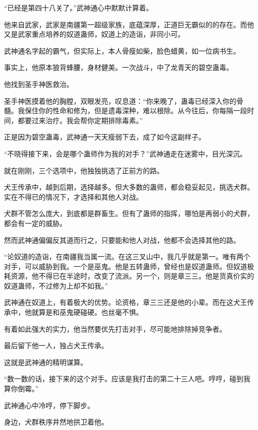 
\begin{this_body}

“已经是第四十八关了。”武神通心中默默计算着。

他来自武家，武家是南疆第一超级家族，底蕴深厚，正道巨无霸似的的存在。而他又是武家重点培养的奴道蛊师，奴道上的造诣，非同小可。

武神通名字起的霸气，但实际上，本人骨瘦如柴，脸色蜡黄，如一位病书生。

事实上，他原本狼背蜂腰，身材健美。一次战斗，中了龙青天的碧空蛊毒。

他找到圣手神医救治。

圣手神医摸着他的胸膛，双眼发亮，叹息道：“你来晚了，蛊毒已经深入你的骨髓。我保住你的性命和修为，但是遗毒深种，难以根除。从今往后，你每隔一段时间，都要过来治疗。我会帮你定期排除毒素。”

正是因为碧空蛊毒，武神通一天天瘦弱下去，成了如今这副样子。

“不晓得接下来，会是哪个蛊师作为我的对手？”武神通走在迷雾中，目光深沉。

就在刚刚，三个选项中，他独独挑选了正前方的路。

犬王传承中，越到后期，选择越多。但大多数的蛊师，都会稳妥起见，挑选犬群。实在不得已的情况下，才选择和其他人对战。

犬群不管怎么庞大，到底都是群畜生。但有了蛊师的指挥，哪怕是再弱小的犬群，都会有一定的威胁。

然而武神通偏偏反其道而行之，只要能和他人对战，他都不会选择其他的路。

“论奴道的造诣，在南疆我当属一流。在这三叉山中，我几乎就是第一。唯有两个对手，可以威胁到我。一个是巫鬼。他是五转蛊师，曾经也是奴道蛊师。但奴道极耗资源，他不得已在半途时，改变了流派。另一个，则是章三三。他是货真价实的奴道蛊师，不过修为上却不如我。”

武神通在奴道上，有着极大的优势。论资格，章三三还是他的小辈。而在这犬王传承中，他就算是和巫鬼硬碰硬。也丝毫不惧。

有着如此强大的实力，他当然要优先打击对手，尽可能地排除掉竞争者。

最后留下他一人，独占犬王传承。

这就是武神通的精明谋算。

“数一数的话，接下来的这个对手。应该是我打击的第二十三人吧。哼哼，碰到我算你倒霉。”

武神通心中冷哼，停下脚步。

身边，犬群秩序井然地拱卫着他。


\end{this_body}
